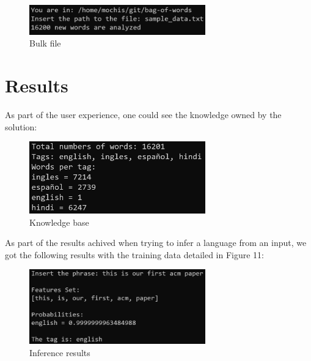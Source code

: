 \documentclass[sigconf,12pt,review=false,natbib=false]{acmart}
\begin{document}
\begin{figure}[h!]
    \centering
    \includegraphics[width=3in]{bulk_file}
    \caption{Bulk file}
    \label{fig:bulk_file}
\end{figure}


\section{Results}

As part of the user experience, one could see the knowledge owned by the solution: \\

\begin{figure}[h!]
    \centering
    \includegraphics[width=3in]{knowledge}
    \caption{Knowledge base}
    \label{fig:knowledge}
\end{figure}

As part of the results achived when trying to infer a language from an input, we got the following results with the
training data detailed in Figure 11:

\begin{figure}[h!]
    \centering
    \includegraphics[width=3in]{inference}
    \caption{Inference results}
    \label{fig:inference}
\end{figure}
\end{document}
